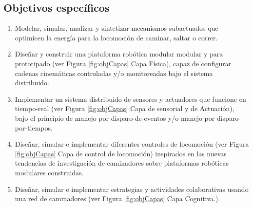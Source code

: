 \subsection[Especificos]{Objetivos espec\'ificos}
\label{sec:objesp}
\begin{enumerate}[\textbf{OE:} 1.]
\item Modelar, simular, analizar y sintetizar mecanismos subactuados que optimicen la energ\'ia para la locomoci\'on de caminar, saltar o correr.\par 
\item Dise\~nar y construir una plataforma rob\'otica modular modular y para prototipado (ver Figura \ref{fig:objCapas} Capa Física), capaz de configurar cadenas cinem\'aticas  controladas y/o monitoreadas bajo el sistema distribuido.\par
\item Implementar un sistema distribuido de sensores y actuadores que funcione en tiempo-real  (ver Figura \ref{fig:objCapas} Capa de sensorial y de Actuaci\'on), bajo el principio de manejo por disparo-de-eventos y/o manejo por disparo-por-tiempos\cite{Kimm2012}.\par
\item Dise\~nar, simular e implementar diferentes controles de locomoci\'on (ver Figura \ref{fig:objCapas} Capa de control de locomoci\'on) inspirados en las nuevas tendencias de investigaci\'on de caminadores sobre plataformas rob\'oticas modulares construidas.\par
\item Dise\~nar, simular e implementar estrategias y actividades colaborativas usando una red de caminadores  (ver Figura \ref{fig:objCapas} Capa Cognitiva.).\par
\end{enumerate}
